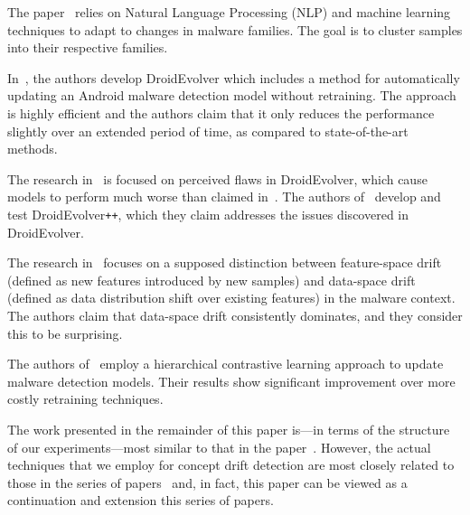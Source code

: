 The paper~\cite{Karbab} relies on Natural Language Processing (NLP)
and machine learning techniques to adapt to changes in malware families. 
The goal is to cluster samples into their respective families.

In~\cite{Xu}, the authors develop DroidEvolver which includes a method 
for automatically updating an Android malware
detection model without retraining. The approach is highly efficient 
and the authors claim that it only reduces the performance
slightly over an extended period of time, as compared to state-of-the-art methods.

The research in~\cite{Kan} is focused on perceived flaws in DroidEvolver, which cause models
to perform much worse than claimed in~\cite{Xu}. The authors of~\cite{Kan} develop and test
DroidEvolver\texttt{++}, which they claim addresses the issues discovered in DroidEvolver.

The research in~\cite{Chen} focuses on a supposed distinction between 
feature-space drift (defined as new features introduced by new 
samples) and data-space drift (defined as data distribution 
shift over existing features) in the malware context. The authors 
claim that data-space drift consistently dominates, and they consider
this to be surprising.

The authors of~\cite{Yizheng} employ a hierarchical contrastive learning approach to update 
malware detection models. Their results show significant improvement over more costly 
retraining techniques.

The work presented in the remainder of this paper
is---in terms of the structure of our experiments---most similar to that in the paper~\cite{Molina}.
However, the actual techniques that we employ for concept drift detection are 
most closely related to those in the series of papers~\cite{Sunhera,Lolitha,Mayuri}
and, in fact, this paper can be viewed as a continuation and extension this series of papers.
